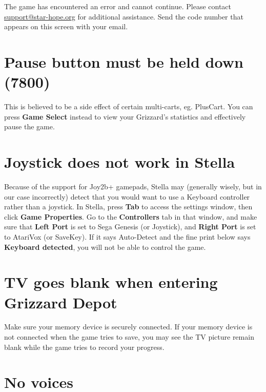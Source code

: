 \documentclass[9pt,twocolumn,openany,article]{memoir}
\begin{document}
The game  has encountered an  error and cannot continue.  Please contact
\href{mailto:support@star-hope.org}{support@star-hope.org}           for
additional assistance. Send the code  number that appears on this screen
with your email.

\ifdefined\ATARIAGESAVE\else

\section*{Pause button must be held down (7800)}

This  is believed  to  be  a side  effect  of  certain multi-carts,  eg.
PlusCart.  You  can press  \textbf{Game  Select}  instead to  view  your
Grizzard's statistics and effectively pause the game.

\section*{Joystick does not work in Stella}

Because  of  the support  for  Joy2b+  gamepads, Stella  may  (generally
wisely, but in  our case incorrectly) detect that you  would want to use
a  Keyboard  controller  rather  than   a  joystick.  In  Stella,  press
\textbf{Tab}  to access  the  settings window,  then click  \textbf{Game
  Properties}. Go  to the \textbf{Controllers}  tab in that  window, and
make sure that \textbf{Left Port} is  set to Sega Genesis (or Joystick),
and \textbf{Right  Port} is  set to  AtariVox (or  SaveKey). If  it says
Auto-Detect and  the fine  print below says  \textbf{Keyboard detected},
you will not be able to control the game.

\fi

\ifdefined\NOSAVE\else\ifdefined\ATARIAGESAVE\else

\section*{TV goes blank when entering Grizzard Depot}

Make  sure your  memory device  is  securely connected.  If your  memory
device is not connected when the game  tries to save, you may see the TV
picture remain blank while the game tries to record your progress.

\fi

\section*{No voices}
\end{document}
